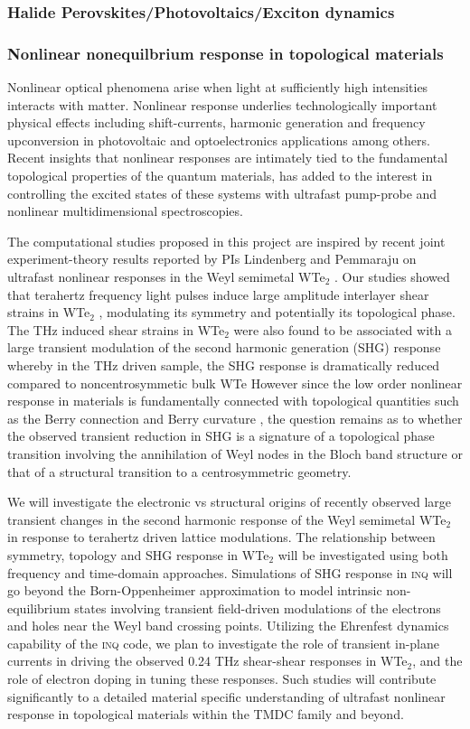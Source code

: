 \subsubsection{Halide Perovskites/Photovoltaics/Exciton dynamics}

\subsubsection{Nonlinear nonequilbrium response in topological materials}

Nonlinear optical phenomena arise when light at sufficiently high intensities interacts with matter. Nonlinear response underlies technologically important physical effects including shift-currents, harmonic generation and frequency upconversion in photovoltaic and optoelectronics applications among others.  Recent insights that nonlinear responses are intimately tied to the fundamental topological properties of the quantum materials, has added to the interest in controlling the excited states of these systems with  ultrafast pump-probe and nonlinear multidimensional spectroscopies.

The computational studies proposed in this project are inspired by recent joint experiment-theory results reported by PIs Lindenberg and Pemmaraju on ultrafast nonlinear responses in the Weyl semimetal WTe$_2$ . Our studies showed that terahertz frequency light pulses induce large amplitude interlayer shear strains in WTe$_2$ , modulating its symmetry and potentially its topological phase. The THz induced shear strains in WTe$_2$ were also found to be associated with a large transient modulation of the second harmonic generation (SHG) response whereby in the THz driven sample, the SHG response is dramatically reduced compared to noncentrosymmetic bulk WTe However since the low order nonlinear response in materials is fundamentally connected with topological quantities such as the Berry connection and Berry curvature , the question remains as to whether the observed transient reduction in SHG is a signature of a topological phase transition involving the annihilation of Weyl nodes in the Bloch band structure or that of a structural transition to a centrosymmetric geometry.

We will investigate the electronic vs structural origins of recently observed large transient changes in the second harmonic response of the Weyl semimetal WTe$_2$ in response to terahertz driven lattice modulations. The relationship between symmetry, topology and SHG response in WTe$_2$ will be investigated using both frequency and time-domain approaches. Simulations of SHG response in \textsc{inq} will go beyond the Born-Oppenheimer approximation to model intrinsic non-equilibrium states involving transient field-driven modulations of the electrons and holes near the Weyl band crossing points. Utilizing the Ehrenfest dynamics capability of the \textsc{inq} code, we plan to investigate the role of transient in-plane currents in driving the observed 0.24 THz shear-shear responses in WTe$_2$, and the role of electron doping in tuning these responses. Such studies will contribute significantly to a detailed material specific understanding of ultrafast nonlinear response in topological materials within the TMDC family and beyond.

\clearpage

